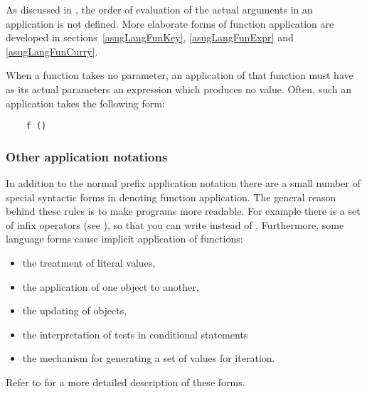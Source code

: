 As discussed in , the order of evaluation
of the actual arguments in an application is not defined.  More elaborate
forms of function application are developed in sections~\ref{asugLangFunKey},
\ref{asugLangFunExpr} and \ref{asugLangFunCurry}.

When a function takes no parameter, an application of that
function must have as its actual parameters an expression which produces
no value.  Often, such an application takes the following form:

\begin{small}
\begin{verbatim}
    f ()
\end{verbatim}
\end{small}

\subsubsection{Other application notations}

In addition to the normal prefix application notation there are a
small number of special syntactic forms in \asharp{} denoting function
application.  The general reason behind these rules is to make
programs more readable.  For example there is a set of infix operators
(see ), so that you can write  instead of .  Furthermore, some language forms cause
implicit application of functions:
\begin{itemize}
\item the treatment of literal values,
\item the application of one object to another,
\item the updating of objects,
\item the interpretation of tests in conditional statements 
\item the mechanism for generating a set of values for iteration.
\end{itemize}
Refer to  for a more detailed description of these forms.


